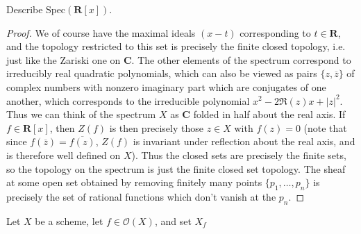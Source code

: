 \begin{theorem}
    Describe $\text{Spec}(\mathbf{R}[x])$.
\end{theorem}
\begin{proof}
    We of course have the maximal ideals $(x - t)$ corresponding to $t \in \mathbf{R}$, and the topology restricted to this set is precisely the finite closed topology, i.e. just like the Zariski one on $\mathbf{C}$. The other elements of the spectrum correspond to irreducibly real quadratic polynomials, which can also be viewed as pairs $\{ z, \overline{z} \}$ of complex numbers with nonzero imaginary part which are conjugates of one another, which corresponds to the irreducible polynomial $x^2 - 2\Re(z)x + |z|^2$. Thus we can think of the spectrum $X$ as $\mathbf{C}$ folded in half about the real axis. If $f \in \mathbf{R}[x]$, then $Z(f)$ is then precisely those $z \in X$ with $f(z) = 0$ (note that since $f(\overline{z}) = \overline{f(z)}$, $Z(f)$ is invariant under reflection about the real axis, and is therefore well defined on $X$). Thus the closed sets are precisely the finite sets, so the topology on the spectrum is just the finite closed set topology. The sheaf at some open set obtained by removing finitely many points $\{ p_1, \dots, p_n \}$ is precisely the set of rational functions which don't vanish at the $p_n$.
\end{proof}

\begin{theorem}
    Let $X$ be a scheme, let $f \in \mathcal{O}(X)$, and set $X_f$
\end{theorem}


